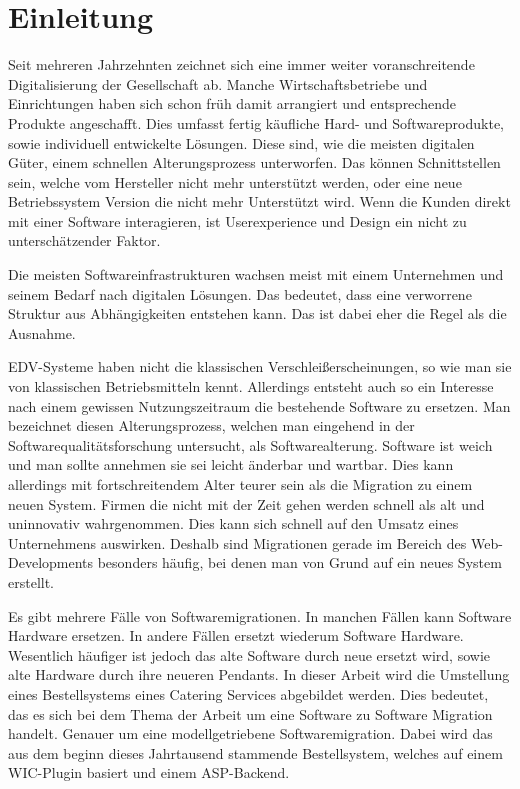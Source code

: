 \chapter{Einleitung}

Seit mehreren Jahrzehnten zeichnet sich eine immer weiter voranschreitende  Digitalisierung der Gesellschaft ab. Manche Wirtschaftsbetriebe und Einrichtungen haben sich schon früh damit arrangiert und entsprechende Produkte angeschafft. Dies umfasst fertig käufliche Hard- und Softwareprodukte, sowie individuell entwickelte Lösungen. Diese sind, wie die meisten digitalen Güter, einem schnellen Alterungsprozess unterworfen. Das können Schnittstellen sein, welche vom Hersteller nicht mehr unterstützt werden, oder eine neue Betriebssystem Version die nicht mehr Unterstützt wird. Wenn die Kunden direkt mit einer Software interagieren, ist Userexperience und Design ein nicht zu unterschätzender Faktor.

Die meisten Softwareinfrastrukturen wachsen meist mit einem Unternehmen und seinem Bedarf nach digitalen Lösungen. Das bedeutet, dass eine verworrene Struktur aus Abhängigkeiten entstehen kann. Das ist dabei eher die Regel als die Ausnahme.

\ac{EDV}-Systeme haben nicht die klassischen Verschleißerscheinungen, so wie man sie von klassischen Betriebsmitteln kennt. Allerdings entsteht auch so ein Interesse nach einem gewissen Nutzungszeitraum die bestehende Software zu ersetzen. Man bezeichnet diesen Alterungsprozess, welchen man eingehend in der Softwarequalitätsforschung untersucht, als Softwarealterung. Software ist \glqq weich\grqq{} und man sollte annehmen sie sei leicht änderbar und wartbar. Dies kann allerdings mit fortschreitendem Alter teurer sein als die Migration zu einem neuen System. Firmen die nicht mit der Zeit gehen werden schnell als alt und uninnovativ wahrgenommen. Dies kann sich schnell auf den Umsatz eines Unternehmens auswirken. Deshalb sind Migrationen gerade im Bereich des Web-Developments besonders häufig, bei denen man von Grund auf ein neues System erstellt.

Es gibt mehrere Fälle von Softwaremigrationen. In manchen Fällen kann Software Hardware ersetzen. In andere Fällen ersetzt wiederum Software Hardware. Wesentlich häufiger ist jedoch das alte Software durch neue ersetzt wird, sowie alte Hardware durch ihre neueren Pendants. In dieser Arbeit wird die Umstellung eines Bestellsystems eines Catering Services abgebildet werden. Dies bedeutet, das es sich bei dem Thema der Arbeit um eine Software zu Software Migration handelt. Genauer um eine modellgetriebene Softwaremigration. 
Dabei wird das aus dem beginn dieses Jahrtausend stammende Bestellsystem, welches auf einem \ac{WIC}-Plugin basiert und einem \ac{ASP}-Backend. 


